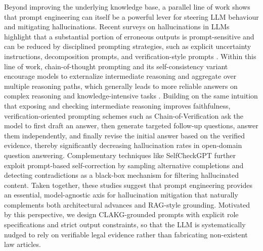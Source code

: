 \documentclass[review,times,nonatbib]{elsarticle} %
\renewcommand{\textcolor}[2]{#2}
\begin{document}
\textcolor{blue}{Beyond improving the underlying knowledge base, a parallel line of work shows that prompt engineering can itself be a powerful lever for steering LLM behaviour and mitigating hallucinations. Recent surveys on hallucinations in LLMs highlight that a substantial portion of erroneous outputs is prompt-sensitive and can be reduced by disciplined prompting strategies, such as explicit uncertainty instructions, decomposition prompts, and verification-style prompts \cite{huang2023hallucination,dang2025survey}. Within this line of work, chain-of-thought prompting and its self-consistency variant encourage models to externalize intermediate reasoning and aggregate over multiple reasoning paths, which generally leads to more reliable answers on complex reasoning and knowledge-intensive tasks \cite{wei2022chain,wang2022self}. Building on the same intuition that exposing and checking intermediate reasoning improves faithfulness, verification-oriented prompting schemes such as Chain-of-Verification \cite{dhuliawala2024cove} ask the model to first draft an answer, then generate targeted follow-up questions, answer them independently, and finally revise the initial answer based on the verified evidence, thereby significantly decreasing hallucination rates in open-domain question answering. Complementary techniques like SelfCheckGPT \cite{manakul2023selfcheckgpt} further exploit prompt-based self-correction by sampling alternative completions and detecting contradictions as a black-box mechanism for filtering hallucinated content. Taken together, these studies suggest that prompt engineering provides an essential, model-agnostic axis for hallucination mitigation that naturally complements both architectural advances and RAG-style grounding. Motivated by this perspective, we design CLAKG-grounded prompts with explicit role specifications and strict output constraints, so that the LLM is systematically nudged to rely on verifiable legal evidence rather than fabricating non-existent law articles.}
\end{document}
